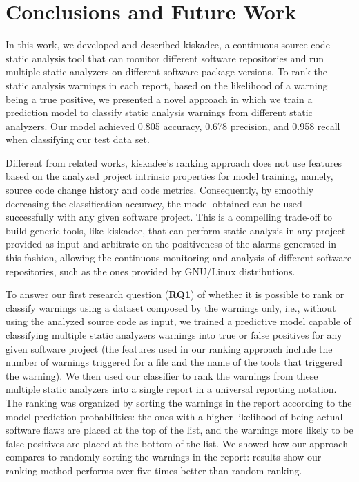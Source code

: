 \chapter{Conclusions and Future Work}
\label{ch:conclusion}

In this work, we developed and described kiskadee, a continuous source code
static analysis tool that can monitor different software repositories and run
multiple static analyzers on different software package versions. To rank the
static analysis warnings in each report, based on the likelihood of a warning
being a true positive, we presented a novel approach in which we train a
prediction model to classify static analysis warnings from different static
analyzers. Our model achieved 0.805 accuracy, 0.678 precision, and 0.958 recall
when classifying our test data set.

Different from related works, kiskadee's ranking approach does not use features
based on the analyzed project intrinsic properties for model training, namely,
source code change history and code metrics. Consequently, by smoothly
decreasing the classification accuracy, the model obtained can be used
successfully with any given software project. This is a compelling trade-off to
build generic tools, like kiskadee, that can perform static analysis in any
project provided as input and arbitrate on the positiveness of the alarms
generated in this fashion, allowing the continuous monitoring and analysis of
different software repositories, such as the ones provided by
GNU/Linux distributions.

To answer our first research question (\textbf{RQ1}) of whether it is possible
to rank or classify warnings using a dataset composed by the warnings only,
i.e., without using the analyzed source code as input, we trained a predictive
model capable of classifying multiple static analyzers warnings into true or
false positives for any given software project (the features used in our
ranking approach include the number of warnings triggered for a file and the
name of the tools that triggered the warning). We then used our classifier to
rank the warnings from these multiple static analyzers into a single report in
a universal reporting notation. The ranking was organized by sorting the
warnings in the report according to the model prediction probabilities: the
ones with a higher likelihood of being actual software flaws are placed at the
top of the list, and the warnings more likely to be false positives are placed
at the bottom of the list. We showed how our approach compares to randomly
sorting the warnings in the report: results show our ranking method performs
over five times better than random ranking.

